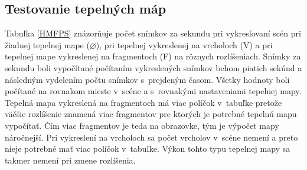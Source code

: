 \subsection*{Testovanie tepelných máp}
Tabuľka \ref{HMFPS} znázorňuje počet snímkov za sekundu pri vykresľovaní scén pri žiadnej tepelnej mape ($\varnothing$), pri tepelnej vykreslenej na vrcholoch (V) a pri tepelnej mape vykreslenej na fragmentoch (F) na rôznych rozlíšeniach. Snímky za sekundu boli vypočítané počítaním vykreslených snímkov behom piatich sekúnd a následným vydelením počtu snímkov s~prejdeným časom. Všetky hodnoty boli počítané na rovnakom mieste v~scéne a s~rovnakými nastaveniami tepelnej mapy. Tepelná mapa vykreslená na fragmentoch má viac políčok v~tabuľke pretože väčšie rozlíšenie znamená viac fragmentov pre ktorých je potrebné tepelnú mapu vypočítať. Čím viac fragmentov je teda na obrazovke, tým je výpočet mapy náročnejší. Pri vykreslení na vrcholoch sa počet vrcholov v~scéne nemení a preto nieje potrebné mať viac políčok v~tabuľke. Výkon tohto typu tepelnej mapy sa takmer nemení pri zmene rozlíšenia.

